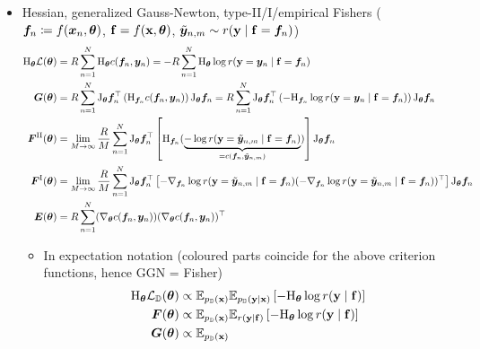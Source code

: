 \begin{itemize}
\item Hessian, generalized Gauss-Newton, type-II/I/empirical Fishers (${\bm{f}}_n \coloneq f({\bm{x}}_n, {\bm{\theta}})$, ${\mathbf{f}} = f({\mathbf{x}}, {\bm{\theta}})$, $\tilde{{\bm{y}}}_{n,m} \sim r({\mathbf{y}} \mid {\mathbf{f}} = {\bm{f}}_n)$)
  \begin{align*}
    \mathrm{H}_{{\bm{\theta}}} {\mathcal{L}}({\bm{\theta}})
    &= R \sum_{n=1}^N \mathrm{H}_{{\bm{\theta}}} c({\bm{f}}_n, {\bm{y}}_n)
      = -R \sum_{n=1}^N \mathrm{H}_{{\bm{\theta}}} \log r({\mathbf{y}} = {\bm{y}}_n \mid {\mathbf{f}} = {\bm{f}}_n)
    \\
    {\bm{G}}({\bm{\theta}})
    &= R \sum_{n=1}^N
      \mathrm{J}_{{\bm{\theta}}} {\bm{f}}_n^{\top}
      \left(
      \mathrm{H}_{{\bm{f}}_n} c({\bm{f}}_n, {\bm{y}}_n)
      \right)
      \mathrm{J}_{{\bm{\theta}}} {\bm{f}}_n
      =
      R \sum_{n=1}^N
      \mathrm{J}_{{\bm{\theta}}} {\bm{f}}_n^{\top}
      \left(
      -\mathrm{H}_{{\bm{f}}_n} \log r({\mathbf{y}} = {\bm{y}}_n \mid {\mathbf{f}} = {\bm{f}}_n)
      \right)
      \mathrm{J}_{{\bm{\theta}}} {\bm{f}}_n
    \\
    {\bm{F}}^{\text{II}}({\bm{\theta}})
    &=
      \lim_{M \to \infty}
      \frac{R}{M}
      \sum_{n=1}^N
      \mathrm{J}_{{\bm{\theta}}} {\bm{f}}_n^{\top}
      \left[
      \mathrm{H}_{{\bm{f}}_n}(\underbrace{- \log r({\mathbf{y}} = \tilde{{\bm{y}}}_{n,m} \mid {\mathbf{f}} = {\bm{f}}_n)}_{= c({\bm{f}}_n, \tilde{{\bm{y}}}_{n,m})} )
      \right]
      \mathrm{J}_{{\bm{\theta}}} {\bm{f}}_n
    \\
    {\bm{F}}^{\text{I}}({\bm{\theta}})
    &=
      \lim_{M \to \infty}
      \frac{R}{M}
      \sum_{n=1}^N
      \mathrm{J}_{{\bm{\theta}}} {\bm{f}}_n^{\top}
      \left[
      -\nabla_{{\bm{f}}_n} \log r({\mathbf{y}} = \tilde{{\bm{y}}}_{n,m} \mid {\mathbf{f}} = {\bm{f}}_n)
      (-\nabla_{{\bm{f}}_n} \log r({\mathbf{y}} = \tilde{{\bm{y}}}_{n,m} \mid {\mathbf{f}} = {\bm{f}}_n))^{\top}
      \right]
      \mathrm{J}_{{\bm{\theta}}} {\bm{f}}_n
    \\
    {\bm{E}}({\bm{\theta}})
    &=
      R
      \sum_{n=1}^N
      (\nabla_{{\bm{\theta}}} c({\bm{f}}_n, {\bm{y}}_n))
      (\nabla_{{\bm{\theta}}} c({\bm{f}}_n, {\bm{y}}_n))^{\top}
  \end{align*}
  \begin{itemize}
  \item In expectation notation (coloured parts coincide for the above criterion functions, hence GGN = Fisher)
    \begin{align*}
      \hess_{\vtheta} \gL_{\sD}(\vtheta)
      &\propto
        \E_{p_{\sD}(\rvx)}
        \E_{p_{\sD}(\rvy \mid \rvx)}
        \left[
        -\hess_{\vtheta} \log r(\rvy \mid \rvf)
        \right]
      \\
      \mF(\vtheta)
      &\propto
        \E_{p_{\sD}(\rvx)}
        \E_{r(\rvy \mid \rvf)}
        \left[
        -\hess_{\vtheta} \log r(\rvy \mid \rvf)
        \right]
      \\
      \mG(\vtheta)
      &\propto
        \E_{p_{\sD}(\rvx)}

\end{align*}
\end{itemize}
\end{itemize}
